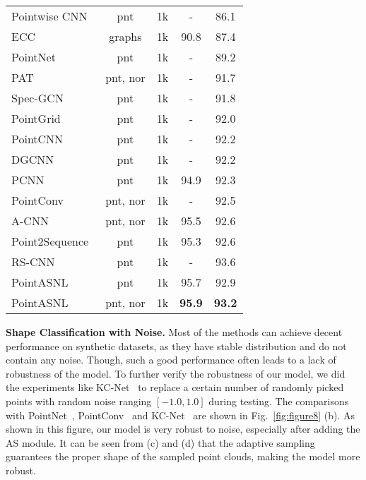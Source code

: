 \documentclass[10pt,twocolumn,letterpaper]{article}
\begin{document}
\begin{table}
\begin{center}
\begin{tabular}{lcccc}
				\hline
				Pointwise CNN~\cite{Pointwise}  &pnt&1k& -  &86.1\\
				ECC~\cite{ecc} &graphs&1k&  90.8&  87.4 \\
				PointNet~\cite{pointnet} &pnt&1k&-  &89.2 \\
				PAT~\cite{Gumbel} &pnt, nor&1k&-  &91.7 \\
				Spec-GCN~\cite{SpecGCN} &pnt&1k&-  &91.8 \\
				PointGrid~\cite{pointgrid} &pnt&1k& - &92.0 \\
				PointCNN~\cite{PointCNN} &pnt&1k&  - &92.2 \\
				DGCNN~\cite{DGCNN} &pnt&1k&  -&  92.2 \\
				PCNN~\cite{PCNN} &pnt&1k& 94.9&  92.3 \\
				PointConv~\cite{PointConv} &pnt, nor&1k& - &92.5 \\
				A-CNN~\cite{acnn} &pnt, nor&1k& 95.5 &92.6 \\
				Point2Sequence~\cite{Point2Sequence} &pnt&1k& 95.3& 92.6 \\
				RS-CNN~\cite{rscnn} &pnt&1k& - & 93.6 \\
				\hline
				PointASNL &pnt&1k&  {95.7}&{92.9} \\
				PointASNL &pnt, nor&1k&  \bf{95.9}&\bf{93.2} \\
				\hline
			\end{tabular}
		\end{center}
		
		\label{tab:tab1}
		\vspace{-0.6cm}
	\end{table}

	{\noindent\bf Shape Classification with Noise.} 
	Most of the methods can achieve decent performance on synthetic datasets, as they have stable distribution and do not contain any noise. Though, such a good performance often leads to a lack of robustness of the model. To further verify the robustness of our model, we did the experiments like KC-Net~\cite{KC-Net} to replace a certain number of randomly picked points with random noise ranging $[-1.0, 1.0]$ during testing. The comparisons with PointNet~\cite{pointnet}, PointConv~\cite{PointConv} and KC-Net~\cite{KC-Net} are shown in Fig.~\ref{fig:figure8} (b). As shown in this figure, our model is very robust to noise, especially after adding the AS module. It can be seen from (c) and (d) that the adaptive sampling guarantees the proper shape of the sampled point clouds, making the model more robust.
	
\end{document}
